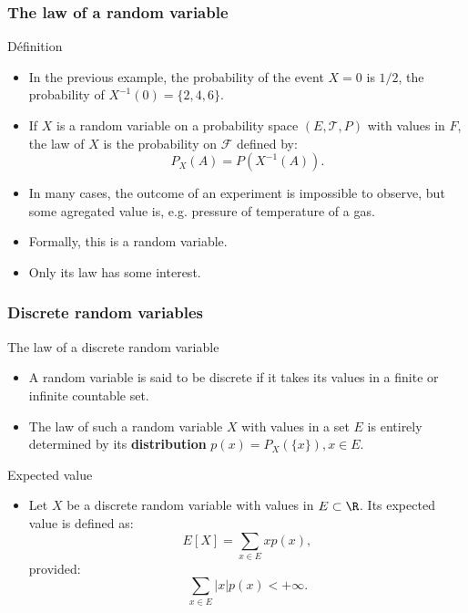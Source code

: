 \begin{frame}
    \frametitle{The law of a random variable}
\begin{block}{Définition}
    \begin{itemize}
        \item<+-> In the previous example,  
        the probability of the event $X=0$ is $1/2$, the probability of  
        $X^{-1}\left( 0 \right)=\{2,4,6\}.$
        \item<+-> If $X$ is a random variable on a probability space $\left( E,\mathcal{T},P \right)$
        with values in $F$, the law of $X$ is the probability on $\mathcal{F}$ defined by:
        \begin{equation}
            P_X \left( A \right) = P \left( X^{-1}(A) \right).
        \end{equation}
    \item<+-> In many cases, the outcome of an experiment is impossible to observe, but 
    some agregated value is, e.g. pressure of temperature of a gas.
    \item<+-> Formally, this is a random variable.
    \item<+-> Only its law has some interest.
   \end{itemize} 
\end{block}    
\end{frame}
\begin{frame}
    \frametitle{Discrete random variables}
\begin{block}{The law of a discrete random variable}
    \begin{itemize}
        \item<+-> A random variable is said to be discrete if it takes its 
        values in a finite or infinite countable set.
        \item<+-> The law of such a random variable $X$ with values in a set $E$ is entirely determined
        by its \textbf{distribution} $p(x) = P_X\left( \{x\} \right), x \in E.$
    \end{itemize}
\end{block}
\begin{block}{Expected value}
    \begin{itemize}
        \item<+-> Let $X$ be a discrete random variable with values in $E\subset \R$. 
        Its expected value is defined as:
        \begin{equation}
            E\left[ X \right] = \sum_{x \in E} x p(x),
        \end{equation}
        provided:
        \begin{equation}
            \sum_{x \in E} \lvert x \rvert p(x)< +\infty.
         \end{equation}
    \end{itemize}
\end{block}
\end{frame}
